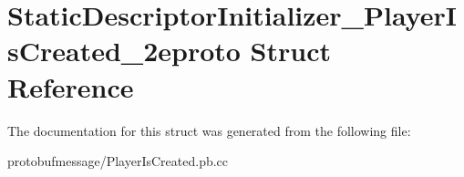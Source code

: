 \hypertarget{struct_static_descriptor_initializer___player_is_created__2eproto}{\section{Static\-Descriptor\-Initializer\-\_\-\-Player\-Is\-Created\-\_\-2eproto Struct Reference}
\label{struct_static_descriptor_initializer___player_is_created__2eproto}
}


The documentation for this struct was generated from the following file\-:\begin{DoxyCompactItemize}
\item 
protobufmessage/Player\-Is\-Created.\-pb.\-cc\end{DoxyCompactItemize}
